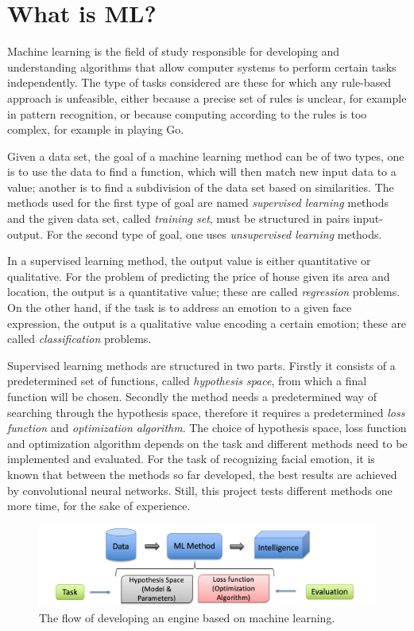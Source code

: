 \section{What is ML?}

Machine learning is the field of study responsible for developing and understanding algorithms that allow computer systems to perform certain tasks independently. The type of tasks considered are these for which any rule-based approach is unfeasible, either because a precise set of rules is unclear, for example in pattern recognition, or because computing according to the rules is too complex, for example in playing Go. 

Given a data set, the goal of a machine learning method can be of two types, one is to use the data to find a function, which will then match new input data to a value; another is to find a subdivision of the data set based on similarities. The methods used for the first type of goal are named \textit{supervised learning} methods and the given data set, called \textit{training set}, must be structured in pairs input-output. For the second type of goal, one uses \textit{unsupervised learning} methods.  

In a supervised learning method, the output value is either quantitative or qualitative. For the problem of predicting the price of house given its area and location, the output is a quantitative value; these are called \textit{regression} problems. On the other hand, if the task is to address an emotion to a given face expression, the output is a qualitative value encoding a certain emotion; these are called \textit{classification} problems.

Supervised learning methods are structured in two parts. Firstly it consists of a predetermined set of functions, called \textit{hypothesis space}, from which a final function will be chosen. Secondly the method needs a predetermined way of searching through the hypothesis space, therefore it requires a predetermined \textit{loss function} and \textit{optimization algorithm}. The choice of hypothesis space, loss function and optimization algorithm depends on the task and different methods need to be implemented and evaluated. For the task of recognizing facial emotion, it is known that between the methods so far developed, the best results are achieved by convolutional neural networks. Still, this project tests different methods one more time, for the sake of experience.

\begin{figure}[hbtp]
	\centering
	\includegraphics[width=1\textwidth]{./Images/MLPipe}
	\caption{The flow of developing an engine based on machine learning.}
	\label{fig:Datensatz - unbearbeitet}
\end{figure}

